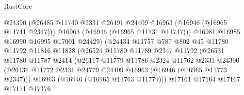 \begin{lexlean}{RustCore}
\begin{coremodule}
                                      @24390
                                      (@26485
                                        @11740
                                        @2331
                                        @26491
                                        @24409
                                        @16963
                                        (@16946 (@16965 @11741 @2347)))
                                      @16963
                                      (@16946 (@16965 @11731 @11747)))
                                    @16981
                                    @16985
                                    @16990
                                    @16995
                                    @17001
                                    @24429)
                                  (@24434
                                    @11757
                                    @787
                                    @802
                                    @45
                                    @11780
                                    @11792
                                    @11816
                                    @11828
                                    (@26524
                                      @11780
                                      @11789
                                      @2347
                                      @11792
                                      (@26531
                                        @11780
                                        @11787
                                        @2414
                                        (@26117
                                          @11779
                                          @11786
                                          @2324
                                          @11762
                                          @2331
                                          @24390
                                          (@26131
                                            @11772
                                            @2331
                                            @24779
                                            @24409
                                            @16963
                                            (@16946 (@16965 @11773 @2347)))
                                          @16963
                                          (@16946 (@16965 @11763 @11779)))
                                        @17161
                                        @17164
                                        @17167
                                        @17171
                                        @17176

\end{coremodule}
\end{lexlean}
